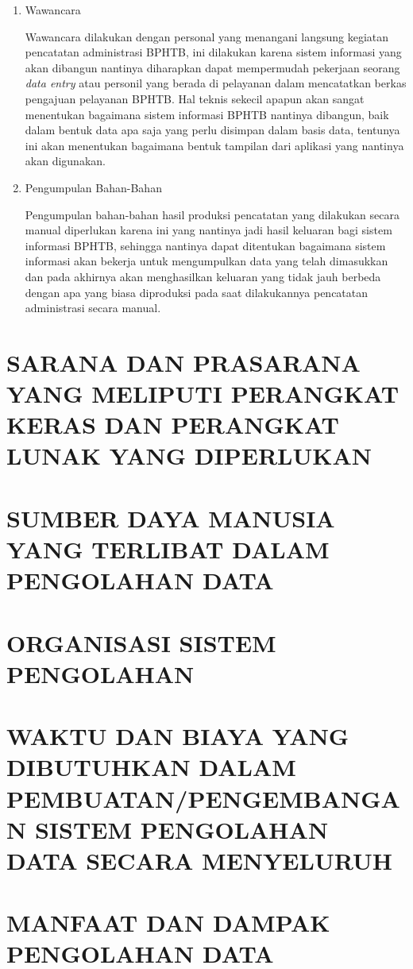 \documentclass[pdftex,12pt, oneside]{article}
\begin{document}
\begin{enumerate}[1.]
\item Wawancara

Wawancara dilakukan dengan personal yang menangani langsung kegiatan pencatatan administrasi BPHTB, ini dilakukan karena sistem informasi yang akan dibangun nantinya diharapkan dapat mempermudah pekerjaan seorang \textit{data entry} atau personil yang berada di pelayanan dalam mencatatkan berkas pengajuan pelayanan BPHTB. Hal teknis sekecil apapun akan sangat menentukan bagaimana sistem informasi BPHTB nantinya dibangun, baik dalam bentuk data apa saja yang perlu disimpan dalam basis data, tentunya ini akan menentukan bagaimana bentuk tampilan dari aplikasi yang nantinya akan digunakan.

\item Pengumpulan Bahan-Bahan

Pengumpulan bahan-bahan hasil produksi pencatatan yang dilakukan secara manual diperlukan karena ini yang nantinya jadi hasil keluaran bagi sistem informasi BPHTB, sehingga nantinya dapat ditentukan bagaimana sistem informasi akan bekerja untuk mengumpulkan data yang telah dimasukkan dan pada akhirnya akan menghasilkan keluaran yang tidak jauh berbeda dengan apa yang biasa diproduksi pada saat dilakukannya pencatatan administrasi secara manual.
\end{enumerate}

\section{SARANA DAN PRASARANA YANG MELIPUTI PERANGKAT KERAS DAN PERANGKAT LUNAK YANG DIPERLUKAN}




\section{SUMBER DAYA MANUSIA YANG TERLIBAT DALAM PENGOLAHAN DATA}


\section{ORGANISASI SISTEM PENGOLAHAN}


\section{WAKTU DAN BIAYA YANG DIBUTUHKAN DALAM PEMBUATAN/PENGEMBANGAN SISTEM PENGOLAHAN DATA SECARA MENYELURUH}


\section{MANFAAT DAN DAMPAK PENGOLAHAN DATA}
\end{document}

